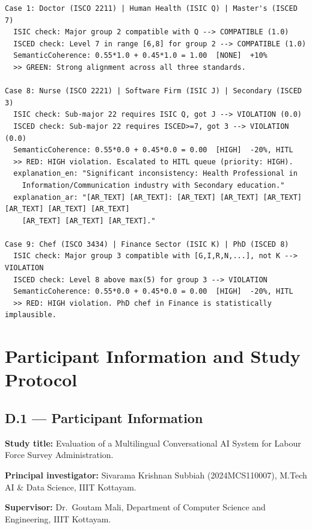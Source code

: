 \begin{lstlisting}[breaklines=true,caption={SRE demo output (representative cases).}]
Case 1: Doctor (ISCO 2211) | Human Health (ISIC Q) | Master's (ISCED 7)
  ISIC check: Major group 2 compatible with Q --> COMPATIBLE (1.0)
  ISCED check: Level 7 in range [6,8] for group 2 --> COMPATIBLE (1.0)
  SemanticCoherence: 0.55*1.0 + 0.45*1.0 = 1.00  [NONE]  +10%
  >> GREEN: Strong alignment across all three standards.

Case 8: Nurse (ISCO 2221) | Software Firm (ISIC J) | Secondary (ISCED 3)
  ISIC check: Sub-major 22 requires ISIC Q, got J --> VIOLATION (0.0)
  ISCED check: Sub-major 22 requires ISCED>=7, got 3 --> VIOLATION (0.0)
  SemanticCoherence: 0.55*0.0 + 0.45*0.0 = 0.00  [HIGH]  -20%, HITL
  >> RED: HIGH violation. Escalated to HITL queue (priority: HIGH).
  explanation_en: "Significant inconsistency: Health Professional in
    Information/Communication industry with Secondary education."
  explanation_ar: "[AR_TEXT] [AR_TEXT]: [AR_TEXT] [AR_TEXT] [AR_TEXT] [AR_TEXT] [AR_TEXT] [AR_TEXT]
    [AR_TEXT] [AR_TEXT] [AR_TEXT]."

Case 9: Chef (ISCO 3434) | Finance Sector (ISIC K) | PhD (ISCED 8)
  ISIC check: Major group 3 compatible with [G,I,R,N,...], not K --> VIOLATION
  ISCED check: Level 8 above max(5) for group 3 --> VIOLATION
  SemanticCoherence: 0.55*0.0 + 0.45*0.0 = 0.00  [HIGH]  -20%, HITL
  >> RED: HIGH violation. PhD chef in Finance is statistically implausible.
\end{lstlisting}

\chapter{Participant Information and Study Protocol}
\label{app:consent}

\section*{D.1 --- Participant Information}

\noindent\textbf{Study title:}
Evaluation of a Multilingual Conversational AI System for Labour Force
Survey Administration.

\noindent\textbf{Principal investigator:}
Sivarama Krishnan Subbiah (2024MCS110007), M.Tech AI \& Data Science,
IIIT Kottayam.

\noindent\textbf{Supervisor:}
Dr.\ Goutam Mali, Department of Computer Science and Engineering, IIIT Kottayam.

